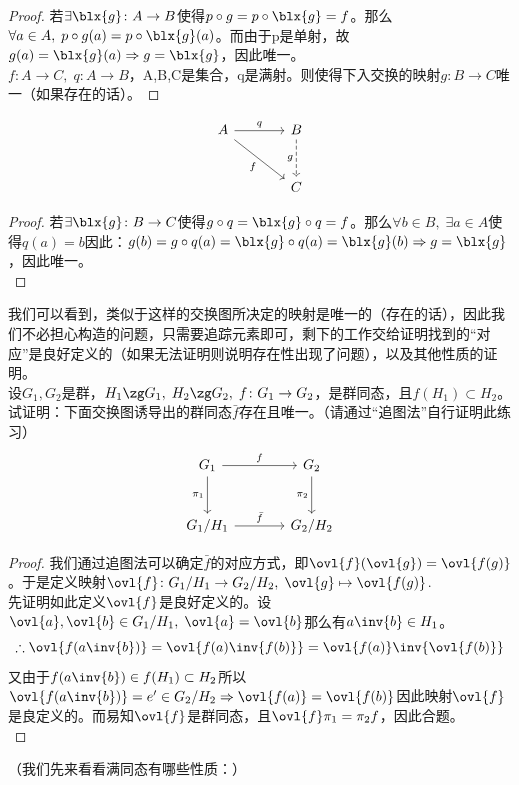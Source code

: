 \begin{proof}
若$\exists \blx{g}\colon A\to B$使得$p\circ g=p\circ \blx{g}=f$。那么$\forall a\in A,\; p\circ g(a)=p\circ \blx{g}(a)$。而由于p是单射，故$g(a)=\blx{g}(a)\Rightarrow g=\blx{g}$，因此唯一。\\
$f\colon A\to C,\; q\colon A\to B$，A,B,C是集合，q是满射。则使得下入交换的映射$g\colon B\to C$唯一（如果存在的话）。
\end{proof}
\[
\begin{tikzcd}[row sep =large, column sep=large]
A  \arrow[r,"q"] \arrow[rd,"f"'] &B \arrow[d,dashed,"g"']\\
& C
\end{tikzcd}
\]
\begin{proof}
若$\exists \blx{g}\colon B\to C$使得$g\circ q=\blx{g}\circ q=f$。那么$\forall b\in B,\; \exists a\in A$使得$q(a)=b$因此：$g(b)=g\circ q(a)=\blx{g}\circ q(a)=\blx{g}(b)\Rightarrow g=\blx{g}$，因此唯一。\\
\end{proof}
我们可以看到，类似于这样的交换图所决定的映射是唯一的（存在的话），因此我们不必担心构造的问题，只需要追踪元素即可，剩下的工作交给证明找到的“对应”是良好定义的（如果无法证明则说明存在性出现了问题），以及其他性质的证明。\\
设$G_1,G_2$是群，$H_1\zg G_1,\; H_2\zg G_2,\; f\colon G_1\to G_2$，是群同态，且$f(H_1)\subset H_2$。试证明：下面交换图诱导出的群同态$\bar{f}$存在且唯一。（请通过“追图法”自行证明此练习）\\
\[
\begin{tikzcd}[row sep=large,column sep=large]
G_1 \arrow[r,"f"] \arrow[d,"\pi_1"'] &G_2 \arrow[d,"\pi_2"']\\
G_1/H_1 \arrow[r,"\bar{f}"] &G_2/H_2
\end{tikzcd}
\]
\begin{proof}
我们通过追图法可以确定$\bar{f}$的对应方式，即$\ovl{f}(\ovl{g})=\ovl{f(g)}$。于是定义映射$\ovl{f}\colon G_1/H_1 \to G_2/H_2,\; \ovl{g}\mapsto \ovl{f(g)}$.\\
先证明如此定义$\ovl{f}$是良好定义的。设$\ovl{a},\ovl{b}\in G_1/H_1,\;\ovl{a}=\ovl{b}$那么有$a\inv{b}\in H_1$。
\[
\therefore \ovl{f(a\inv{b})}=\ovl{f(a)\inv{f(b)}}=\ovl{f(a)}\inv{\ovl{f(b)}}
\]
又由于$f(a\inv{b})\in f(H_1)\subset H_2$所以$\ovl{f(a\inv{b})}=e'\in G_2/H_2\Rightarrow \ovl{f(a)}=\ovl{f(b)}$因此映射$\ovl{f}$是良定义的。而易知$\ovl{f}$是群同态，且$\ovl{f}\pi_1=\pi_2f$，因此合题。\\
\end{proof}
（我们先来看看满同态有哪些性质：）\\
